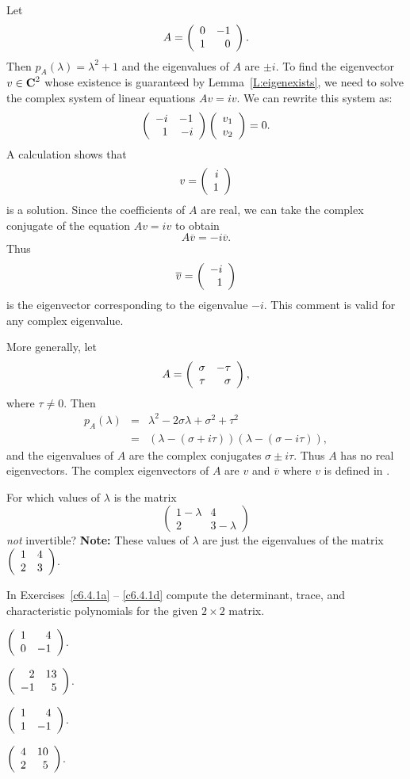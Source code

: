 Let
\[
A = \left(\begin{array}{rr} 0 & -1\\ 1 &0\end{array}\right).
\]
Then $p_A(\lambda)=\lambda^2+1$ and the eigenvalues of $A$ are
$\pm i$.  To find the eigenvector $v\in\mbox{$\bf{C}$}^2$ whose existence is
guaranteed by Lemma~\ref{L:eigenexists}, we need to solve the
complex system of linear equations $Av=iv$.  We can rewrite this
system as:
\[
\left(\begin{array}{rr} -i & -1\\ 1 &-i\end{array}\right)\left(\begin{array}{r} v_1 \\ v_2\end{array}\right) = 0.
\]
A calculation shows that
\begin{equation}  \label{e:eigenv}
v = \left(\begin{array}{r} i \\ 1\end{array}\right)
\end{equation}
is a solution.  Since the coefficients of $A$ are real, we can
take the complex conjugate of the equation $Av=iv$ to obtain
\[
A\overline{v}=-i\overline{v}.
\]
Thus
\[
\overline{v} = \left(\begin{array}{r} -i \\ 1\end{array}\right)
\]
is the eigenvector corresponding to the eigenvalue $-i$.  This
comment is valid for any complex eigenvalue.

More generally, let
\begin{equation}  \label{E:cmplxnf}
A = \left(\begin{array}{rr} \sigma & -\tau\\ \tau &\sigma\end{array}\right),
\end{equation}
where $\tau\neq 0$.  Then
\begin{eqnarray*}
p_A(\lambda) & = & \lambda^2 -2\sigma\lambda+\sigma^2+\tau^2 \\
& = & (\lambda-(\sigma+i\tau))(\lambda-(\sigma-i\tau)),
\end{eqnarray*}
and the eigenvalues of $A$ are the complex conjugates
$\sigma\pm i\tau$.  Thus $A$ has no real eigenvectors.  The
complex eigenvectors of $A$ are $v$ and $\overline{v}$ where $v$
is defined in .




\EXER

\TEXER

\begin{exercise} \label{c4.9.2}
For which values of $\lambda$ is the matrix
\[
\left(\begin{array}{cc} 1-\lambda & 4\\  2 & 3-\lambda
\end{array}\right)
\]
{\em not\/} invertible?  {\bf Note:} These values of $\lambda$
are just the eigenvalues of the matrix $\left(\begin{array}{rr} 1 & 4\\ 2 &3\end{array}\right)$.
\end{exercise}

\noindent In Exercises~\ref{c6.4.1a} -- \ref{c6.4.1d} compute the
determinant, trace, and characteristic polynomials for the given 
$2\times 2$ matrix.
\begin{exercise} \label{c6.4.1a}
$\left(\begin{array}{rr} 1 & 4\\ 0 &-1\end{array}\right)$.
\end{exercise}
\begin{exercise} \label{c6.4.1b}
$\left(\begin{array}{rr} 2 & 13\\ -1 &5\end{array}\right)$.
\end{exercise}
\begin{exercise} \label{c6.4.1c}
$\left(\begin{array}{rr} 1 & 4\\ 1 &-1\end{array}\right)$.
\end{exercise}
\begin{exercise} \label{c6.4.1d}
$\left(\begin{array}{rr} 4 & 10\\ 2 &5\end{array}\right)$.
\end{exercise}


